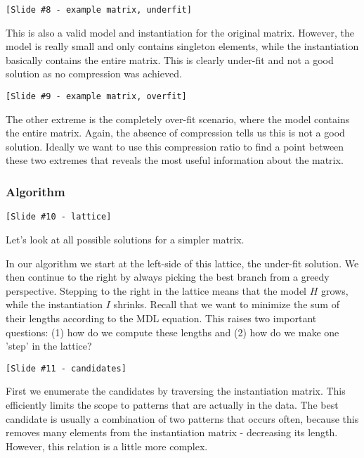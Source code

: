 \documentclass[10pt,a4paper,oneside]{article}
\begin{document}
\begin{verbatim}
[Slide #8 - example matrix, underfit]
\end{verbatim}
 
This is also a valid model and instantiation for the original matrix. However, the model is really small and only contains singleton elements, while the instantiation basically contains the entire matrix. This is clearly under-fit and not a good solution as no compression was achieved.

\begin{verbatim}
[Slide #9 - example matrix, overfit]
\end{verbatim}

The other extreme is the completely over-fit scenario, where the model contains the entire matrix. Again, the absence of compression tells us this is not a good solution. Ideally we want to use this compression ratio to find a point between these two extremes that reveals the most useful information about the matrix.

\subsubsection{Algorithm}

\begin{verbatim}
[Slide #10 - lattice]
\end{verbatim}

Let's look at all possible solutions for a simpler matrix. %

In our algorithm we start at the left-side of this lattice, the under-fit solution. We then continue to the right by always picking the best branch from a greedy perspective. Stepping to the right in the lattice means that the model $H$ grows, while the instantiation $I$ shrinks. Recall that we want to minimize the sum of their lengths according to the MDL equation. This raises two important questions: (1) how do we compute these lengths and (2) how do we make one 'step' in the lattice?

\begin{verbatim}
[Slide #11 - candidates]
\end{verbatim}

First we enumerate the candidates by traversing the instantiation matrix. This efficiently limits the scope to patterns that are actually in the data. The best candidate is usually a combination of two patterns that occurs often, because this removes many elements from the instantiation matrix - decreasing its length. However, this relation is a little more complex.
\end{document}
